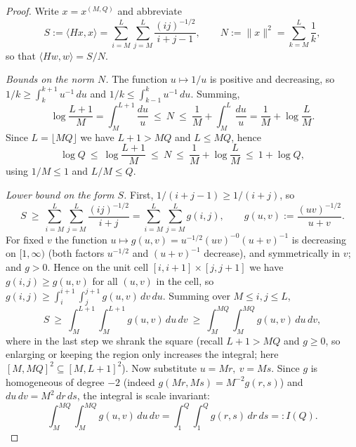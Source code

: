 \documentclass[12pt]{article}
\theoremstyle{remark}
\begin{document}
\begin{proof}
Write $x=x^{(M,Q)}$ and abbreviate
\[
S:=\langle Hx,x\rangle=\sum_{i=M}^{L}\sum_{j=M}^{L}\frac{(ij)^{-1/2}}{i+j-1},
\qquad
N:=\|x\|^2=\sum_{k=M}^{L}\frac1k ,
\]
so that $\langle Hw,w\rangle=S/N$.

\smallskip
\noindent\emph{Bounds on the norm $N$.} The function $u\mapsto 1/u$ is positive and decreasing, so
$1/k\ge\int_k^{k+1}u^{-1}\,du$ and $1/k\le\int_{k-1}^{k}u^{-1}\,du$. Summing,
\[
\log\frac{L+1}{M}=\int_M^{L+1}\frac{du}{u}\ \le\ N\ \le\ \frac1M+\int_M^{L}\frac{du}{u}
=\frac1M+\log\frac LM .
\]
Since $L=\lfloor MQ\rfloor$ we have $L+1>MQ$ and $L\le MQ$, hence
\begin{equation}\label{eq:Nbounds}
\log Q\ \le\ \log\frac{L+1}{M}\ \le\ N\ \le\ \frac1M+\log\frac LM\ \le\ 1+\log Q ,
\end{equation}
using $1/M\le1$ and $L/M\le Q$.

\smallskip
\noindent\emph{Lower bound on the form $S$.} First, $1/(i+j-1)\ge1/(i+j)$, so
\[
S\ \ge\ \sum_{i=M}^{L}\sum_{j=M}^{L}\frac{(ij)^{-1/2}}{i+j}
=\sum_{i=M}^{L}\sum_{j=M}^{L} g(i,j),\qquad g(u,v):=\frac{(uv)^{-1/2}}{u+v} .
\]
For fixed $v$ the function $u\mapsto g(u,v)=u^{-1/2}(uv)^{-0}(u+v)^{-1}$ is decreasing on
$[1,\infty)$ (both factors $u^{-1/2}$ and $(u+v)^{-1}$ decrease), and symmetrically in $v$; and
$g>0$. Hence on the unit cell $[i,i+1]\times[j,j+1]$ we have $g(i,j)\ge g(u,v)$ for all $(u,v)$ in
the cell, so $g(i,j)\ge\int_i^{i+1}\int_j^{j+1}g(u,v)\,dv\,du$. Summing over $M\le i,j\le L$,
\[
S\ \ge\ \int_M^{L+1}\!\int_M^{L+1} g(u,v)\,du\,dv\ \ge\ \int_M^{MQ}\!\int_M^{MQ} g(u,v)\,du\,dv ,
\]
where in the last step we shrank the square (recall $L+1>MQ$ and $g\ge0$, so enlarging or keeping
the region only increases the integral; here $[M,MQ]^2\subseteq[M,L+1]^2$). Now substitute
$u=Mr,\ v=Ms$. Since $g$ is homogeneous of degree $-2$ (indeed
$g(Mr,Ms)=M^{-2}g(r,s)$) and $du\,dv=M^2\,dr\,ds$, the integral is scale invariant:
\[
\int_M^{MQ}\!\int_M^{MQ} g(u,v)\,du\,dv=\int_1^{Q}\!\int_1^{Q} g(r,s)\,dr\,ds=:I(Q) .
\]


\end{proof}
\end{document}
